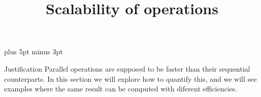 \documentclass[11pt]{beamer}
\begin{document}
\parskip=10pt plus 5pt minus 3pt


\title{Scalability of operations}
\author{\hpcteachers}
\date{\hpcsemester}

\begin{frame}
  \titlepage
\end{frame}

\begin{frame}{Justification}
  Parallel operations are supposed to be faster than their sequential
  counterparts. In this section we will explore how to quantify this,
  and we will see examples where the same result can be computed with
  diferent efficiencies.
\end{frame}








\end{document}
